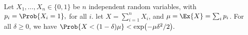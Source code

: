 \begin{lemma}
    Let $X_1, \ldots, X_n \in \{0,1\}$ be $n$ independent random
    variables, with
    \begin{math}
        p_i = \Prob{ \bigl. X_i = 1 },
    \end{math}
    for all $i$.  let $X = \sum_{i=1}^{n} X_i$, and
    $\mu = \Ex{\bigl. X} = \sum_i p_i$. For all $\delta \geq 0$, we
    have
    \begin{math}
        \Prob{\bigl. X < (1-\delta)\mu } < \exp\bigl(-\mu\delta^2/2
        \bigr).
    \end{math}
\end{lemma}
